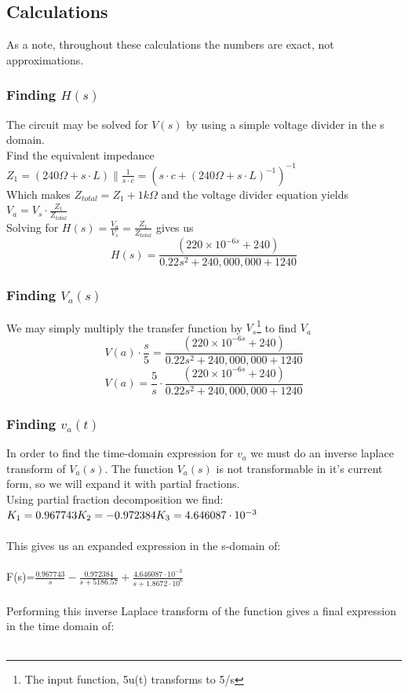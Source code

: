 \documentclass[11pt]{article}
\begin{document}
	
	\subsection*{Calculations}
	As a note, throughout these calculations the numbers are exact, not approximations. 
	\subsubsection*{Finding $H(s)$}
	The circuit may be solved for $V(s)$ by using a simple voltage divider in the s domain.\\ 
	Find the equivalent impedance $Z_1= (240 \Omega + s \cdot L) \parallel \frac{1}{s\cdot c} = (s\cdot c+(240 \Omega + s \cdot L)^{-1})^{-1}$ \\
	Which makes $Z_{total}=Z_1+1k\Omega$ and the voltage divider equation yields $V_a=V_s\cdot \frac{Z_1}{Z_{total}}$\\
	Solving for $H(s)=\frac{V_a}{V_s}=\frac{Z_1}{Z_{total}}$ gives us\\


	\[ H(s)= \frac{(220\times10^{-6s}+240)}{0.22s^{2}+240,000,000+1240} \]
	\subsubsection*{Finding $V_a(s)$}
	We may simply multiply the transfer function by $V_s$\footnote{The input function, 5u(t) transforms to 5/s} to find $V_a$\\
	\[ V(a) \cdot \frac{s}{5}= \frac{(220\times10^{-6s}+240)}{0.22s^{2}+240,000,000+1240} \]
	\[ V(a) =\frac{5}{s}\cdot\frac{(220\times10^{-6s}+240)}{0.22s^{2}+240,000,000+1240} \]
	\newpage
	\subsubsection*{Finding $v_a(t)$}
	In order to find the time-domain expression for $v_a$ we must do an inverse laplace transform of $V_a(s)$. The function $V_a(s)$ is not transformable in it's current form, so we will expand it with partial fractions.\\
	Using partial fraction decomposition we find:\\
	$K_{1}=0.967743\\
	K_{2}=-0.972384\\
	K_{3}=4.646087 \cdot10^{-3}$\\\\
	This gives us an expanded expression in the s-domain of:\\\\
	F(s)=$\frac{0.967743}{s}- \frac{0.972384}{s+5186.57}+\frac{4.646087\cdot10^{-3}}{s+1.8672\cdot10^{6}}$\\\\
	Performing this inverse Laplace transform of the function gives a final expression in the time domain of:\\\\
	
\end{document}
